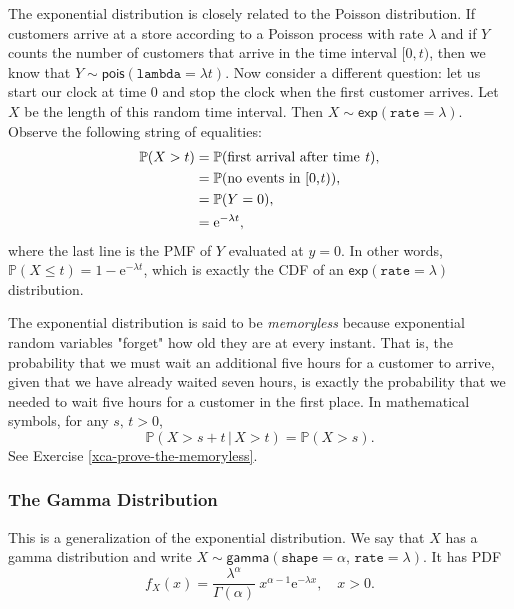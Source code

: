 The exponential distribution is closely related to the Poisson
distribution. If customers arrive at a store according to a Poisson
process with rate \(\lambda\) and if \(Y\) counts the number of
customers that arrive in the time interval \([0,t)\), then we know that \( Y \sim
\mathsf{pois}(\mathtt{lambda}=\lambda t). \) Now consider a different
question: let us start our clock at time 0 and stop the clock when the
first customer arrives. Let \(X\) be the length of this random time
interval. Then \(X\sim\mathsf{exp}(\mathtt{rate}=\lambda)\). Observe
the following string of equalities:
\begin{align*}
\mathbb{P}(X>t) & =\mathbb{P}(\mbox{first arrival after time \emph{t}}),\\
 & =\mathbb{P}(\mbox{no events in [0,\emph{t})}),\\
 & =\mathbb{P}(Y=0),\\
 & =\mathrm{e}^{-\lambda t},
\end{align*}
where the last line is the PMF of \(Y\) evaluated at \(y=0\). In other
words, \(\mathbb{P}(X\leq t)=1-\mathrm{e}^{-\lambda t}\), which is
exactly the CDF of an \(\mathsf{exp}(\mathtt{rate}=\lambda)\)
distribution.

The exponential distribution is said to be \emph{memoryless} because
exponential random variables "forget" how old they are at every
instant. That is, the probability that we must wait an additional five
hours for a customer to arrive, given that we have already waited
seven hours, is exactly the probability that we needed to wait five
hours for a customer in the first place. In mathematical symbols, for
any \(s,\, t>0\),
\begin{equation}
\mathbb{P}(X>s+t\,|\, X>t)=\mathbb{P}(X>s).
\end{equation}
See Exercise \ref{xca-prove-the-memoryless}.

\subsubsection{The Gamma Distribution}
\label{sec-6-5-1-2}

This is a generalization of the exponential distribution. We say that
\(X\) has a gamma distribution and write
\(X\sim\mathsf{gamma}(\mathtt{shape}=\alpha,\,\mathtt{rate}=\lambda)\). It
has PDF
\begin{equation}
f_{X}(x)=\frac{\lambda^{\alpha}}{\Gamma(\alpha)}\: x^{\alpha-1}\mathrm{e}^{-\lambda x},\quad x>0.
\end{equation}

